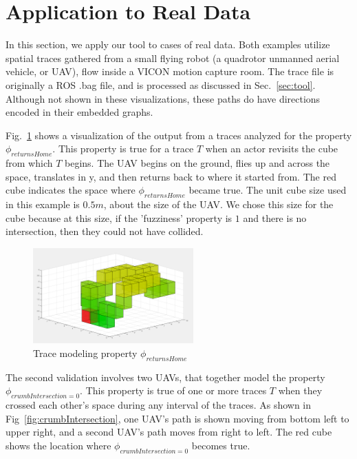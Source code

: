 \section{Application to Real Data}
\label{sec:application}

In this section, we apply our tool to cases of real data.
Both examples utilize spatial traces gathered from a small flying robot (a quadrotor unmanned aerial vehicle, or UAV), flow inside a VICON motion capture room.
The trace file is originally a ROS .bag file, and is processed as discussed in Sec.~\ref{sec:tool}. 
Although not shown in these visualizations, these paths do have directions encoded in their embedded graphs.

Fig.~\ref{fig:returnsHome} shows a visualization of the output from a traces analyzed for the property $\phi_{returnsHome}$.
This property is true for a trace $T$ when an actor revisits the cube from which $T$ begins.
The UAV begins on the ground, flies up and across the space, translates in y, and then returns back to where it started from.
The red cube indicates the space where $\phi_{returnsHome}$ became true.
The unit cube size used in this example is $0.5m$, about the size of the UAV.
We chose this size for the cube because at this size, if the 'fuzziness' property is $1$ and there is no intersection, then they could not have collided.


\begin{figure}
  \centering
  \includegraphics[width=0.55\textwidth]{./figures/returnsHome}
    \caption{Trace modeling property $\phi_{returnsHome}$}
    \label{fig:returnsHome}
\end{figure}

The second validation involves two UAVs, that together model the property $\phi_{crumbIntersection=0}$.
This property is true of one or more traces $T$ when they crossed each other's space during any interval of the traces.
As shown in Fig~\ref{fig:crumbIntersection}, one UAV's path is shown moving from bottom left to upper right, and a second UAV's path moves from right to left.
The red cube shows the location where $\phi_{crumbIntersection=0}$ becomes true.

